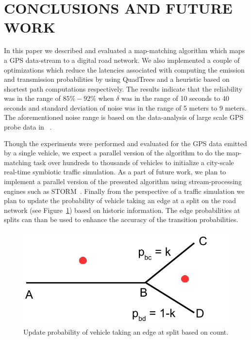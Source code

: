 \documentclass{wscpaperproc}
\theoremstyle{wsc}
\begin{document}
\section{CONCLUSIONS AND FUTURE WORK}
\label{sec:conclusion}

In this paper we described and evaluated a map-matching algorithm which maps a GPS data-stream to a digital road network. We also implemented a couple of optimizations which reduce the latencies associated with computing the emission and transmission probabilities by using QuadTrees and a heuristic based on shortest path computations respectively.  The results indicate that the reliability was in the range of $85\% - 92\%$ when $\delta$ was in the range of 10 seconds to 40 seconds and standard deviation of noise was in the range of 5 meters to 9 meters. The aforementioned noise range is based on the data-analysis of large scale GPS probe data in ~. 

Though the experiments were performed and evaluated for the GPS data emitted by a single vehicle, we expect a parallel version of the algorithm to do the map-matching task over hundreds to thousands of vehicles to initialize a city-scale real-time symbiotic traffic simulation. As a part of future work, we plan to implement a parallel version of the presented algorithm using stream-processing engines such as STORM~\cite{STORM}. Finally from the perspective of a traffic simulation we plan to update the probability of vehicle taking an edge at a split on the road network (see Figure~\ref{fig:split}) based on historic information. The edge probabilities at splits can than be used to enhance the accuracy of the transition probabilities.
\begin{figure}[!htbp]
 \centering
 \includegraphics[scale=0.6]{split.pdf}
 \caption{Update probability of vehicle taking an edge at split based on count. }
 \label{fig:split}
\end{figure}
\end{document}
